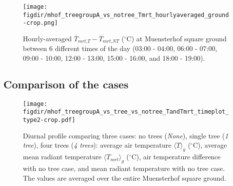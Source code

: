 \begin{figure}[t]
	\centering
	\texttt{[image: \\figdir/mhof\_treegroupA\_vs\_notree\_Tmrt\_hourlyaveraged\_ground-crop.png]}
	\caption{Hourly-averaged $\overline{T}_{\textit{mrt,T}}-\overline{T}_{\textit{mrt,NT}}$ ($^{\circ}$C) at Muenster\-hof square ground between 6 different times of the day (03:00 - 04:00, 06:00 - 07:00, 09:00 - 10:00, 12:00 - 13:00, 15:00 - 16:00, and 18:00 - 19:00).}
	\label{fig:mTmrtdiff_muensterhof}
\end{figure}


\subsection{Comparison of the cases}

\begin{figure}[t]
	\centering
	\texttt{[image: \\figdir/mhof\_treegroupA\_vs\_tree\_vs\_notree\_TandTmrt\_timeplot\_type2-crop.pdf]}
	\caption{Diurnal profile comparing three cases: no trees (\textit{None}), single tree (\textit{1 tree}), four trees (\textit{4 trees}):  average air temperature $\langle T\rangle_g$ ($^{\circ}$C),  average mean radiant temperature $\langle \textit{T}_{\textit{mrt}}\rangle_g$ ($^{\circ}$C),  air temperature difference with no tree case, and  mean radiant temperature with no tree case. The values are averaged over the entire Muensterhof square ground.}
	\label{fig:mhofprofile_T_Tmrt}
\end{figure}

